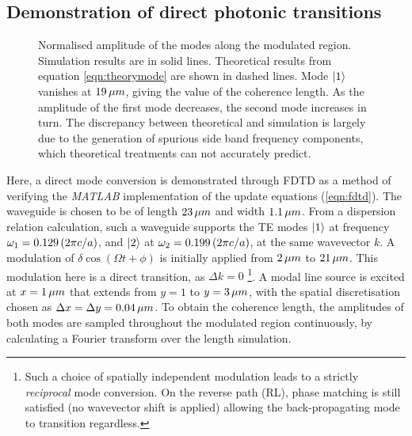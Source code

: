 \subsection{Demonstration of direct photonic transitions}
\label{sec:demonstration}
%	

\begin{figure}[t]
	\centering
	\setlength{\figH}{\textwidth}
	\setlength{\figW}{\textwidth}
	
	\caption[Power spectrum of mode transitions]{Normalised amplitude of the modes along the modulated region. Simulation results are in solid lines. Theoretical results from equation \ref{eqn:theorymode} are shown in dashed lines. Mode $\ket{1}$ vanishes at $19 \mskip3mu \mu m$, giving the value of the coherence length. As the amplitude of the first mode decreases, the second mode increases in turn. The discrepancy between theoretical and simulation is largely due to the generation of spurious side band frequency components, which theoretical treatments can not accurately predict.}
	\label{fig:coherencelengthtd}
\end{figure} 

Here, a direct mode conversion is demonstrated through FDTD as a method of verifying the \textit{MATLAB} implementation of the update equations (\ref{eqn:fdtd}). The waveguide is chosen to be of length $23\mskip3mu \mu m$ and width $1.1\mskip3mu \mu m$. From a dispersion relation calculation, such a waveguide supports the TE modes $\ket{1}$ at frequency $\omega_1 = 0.129 \mskip3mu (2 \pi c/a)$, and $\ket{2}$ at $\omega_2 = 0.199 \mskip3mu (2 \pi c/a)$, at the same wavevector $k$. A modulation of $\delta \cos (\Omega t + \phi)$ is initially applied from $2  \mskip3mu \mu m$ to $21 \mskip3mu \mu m$. This modulation here is a direct transition, as $\Delta k = 0$ \footnote{Such a choice of spatially independent modulation leads to a strictly \textit{reciprocal} mode conversion. On the reverse path (RL), phase matching is still satisfied (no wavevector shift is applied) allowing the back-propagating mode to transition regardless.}. A modal line source is excited at $x = 1 \mskip3mu \mu m$ that extends from $y=1$ to $y=3 \mskip3mu \mu m$, with the spatial discretisation chosen as $\Delta x = \Delta y = 0.04 \mskip3mu \mu m$. To obtain the coherence length, the amplitudes of both modes are sampled throughout the modulated region continuously, by calculating a Fourier transform over the length simulation.

